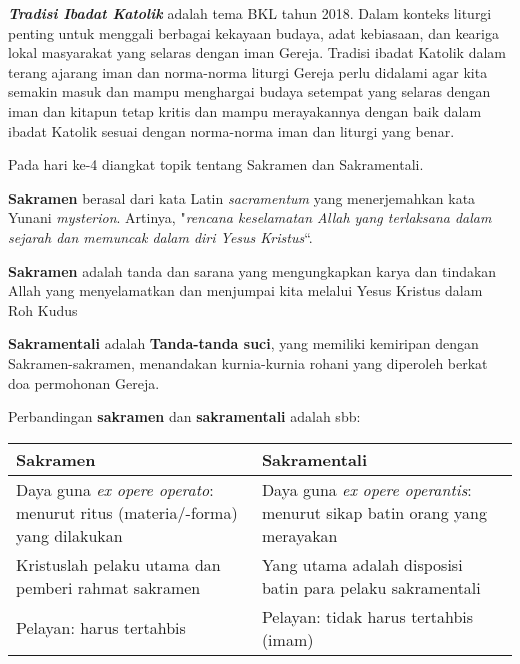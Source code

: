 \begin{floatingfigure}[l]{5cm}
	\begin{center}
	\end{center}
\end{floatingfigure}

 \textit{\textbf{Tradisi Ibadat Katolik}} adalah tema BKL tahun 2018. Dalam konteks liturgi penting untuk menggali berbagai kekayaan budaya, adat kebiasaan, dan keariga lokal masyarakat yang selaras dengan iman Gereja. Tradisi ibadat Katolik dalam terang ajarang iman dan norma-norma liturgi Gereja perlu didalami agar kita semakin masuk dan mampu menghargai budaya setempat yang selaras dengan iman dan kitapun tetap kritis dan mampu merayakannya dengan baik dalam ibadat Katolik sesuai dengan norma-norma iman dan liturgi yang benar.

Pada hari ke-4 diangkat topik tentang Sakramen dan Sakramentali.

\textbf{Sakramen} berasal dari kata Latin \textit{sacramentum} yang
menerjemahkan   kata Yunani \textit{mysterion}.   Artinya,
"\textit{rencana keselamatan Allah yang terlaksana dalam
sejarah dan memuncak dalam diri Yesus Kristus}“.

\textbf{Sakramen} adalah tanda dan sarana yang
mengungkapkan karya dan tindakan Allah yang
menyelamatkan dan menjumpai kita melalui Yesus
Kristus dalam Roh Kudus

\textbf{Sakramentali} adalah \textbf{Tanda-tanda suci}, yang memiliki kemiripan dengan Sakramen-sakramen,     menandakan     kurnia-kurnia rohani yang diperoleh berkat doa
permohonan Gereja.

Perbandingan \textbf{sakramen} dan \textbf{sakramentali} adalah sbb:

\small
\begin{tabular}{|p{}|p{}|}
	\hline
	Sakramen & Sakramentali\\ \hline
	Daya guna \textit{ex opere operato}: menurut ritus (materia/-forma) yang dilakukan &
	Daya guna \textit{ex opere operantis}: menurut sikap batin orang yang merayakan\\ \hline
	Kristuslah pelaku utama dan pemberi rahmat sakramen &
	Yang utama adalah disposisi batin para pelaku sakramentali \\ \hline
	Pelayan: harus tertahbis & Pelayan: tidak harus tertahbis (imam) \\ \hline
\end{tabular}	
\normalsize



